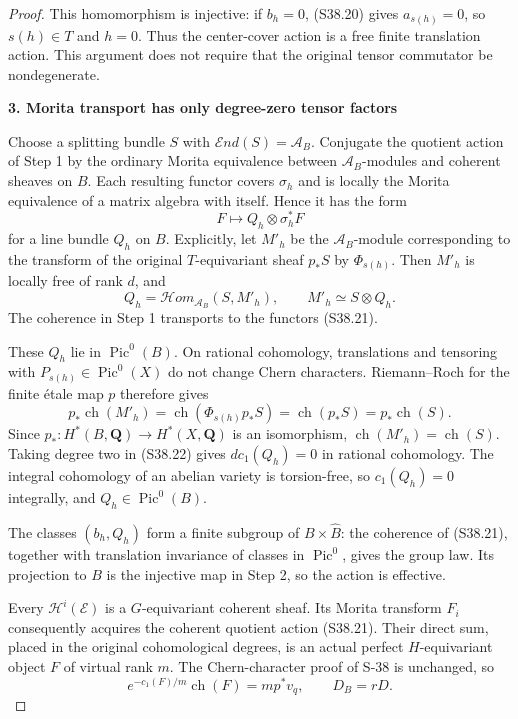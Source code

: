 \begin{proof}
This homomorphism is injective: if \(b_h=0\), (S38.20) gives \(a_{s(h)}=0\), so \(s(h)\in T\) and \(h=0\). Thus the center-cover action is a free finite translation action. This argument does not require that the original tensor commutator be nondegenerate.

\par

\medskip\noindent\textbf{3. Morita transport has only degree-zero tensor factors}\quad

Choose a splitting bundle \(S\) with \(\mathcal End(S)=\mathscr A_B\). Conjugate the quotient action of Step 1 by the ordinary Morita equivalence between \(\mathscr A_B\)-modules and coherent sheaves on \(B\). Each resulting functor covers \(\sigma_h\) and is locally the Morita equivalence of a matrix algebra with itself. Hence it has the form \[
 F\longmapsto Q_h\otimes\sigma_h^*F
 \tag{S38.21}
\] for a line bundle \(Q_h\) on \(B\). Explicitly, let \(M'_h\) be the \(\mathscr A_B\)-module corresponding to the transform of the original \(T\)-equivariant sheaf \(p_*S\) by \(\Phi_{s(h)}\). Then \(M'_h\) is locally free of rank \(d\), and \[
 Q_h=\mathcal Hom_{\mathscr A_B}(S,M'_h),\qquad
 M'_h\simeq S\otimes Q_h.
 \tag{S38.22}
\] The coherence in Step 1 transports to the functors (S38.21).

These \(Q_h\) lie in \(\operatorname{Pic}^0(B)\). On rational cohomology, translations and tensoring with \(P_{s(h)}\in\operatorname{Pic}^0(X)\) do not change Chern characters. Riemann--Roch for the finite étale map \(p\) therefore gives \[
 p_*\operatorname{ch}(M'_h)
 =\operatorname{ch}(\Phi_{s(h)}p_*S)
 =\operatorname{ch}(p_*S)
 =p_*\operatorname{ch}(S).
\] Since \(p_*:H^*(B,\mathbf Q)\to H^*(X,\mathbf Q)\) is an isomorphism, \(\operatorname{ch}(M'_h)=\operatorname{ch}(S)\). Taking degree two in (S38.22) gives \(d c_1(Q_h)=0\) in rational cohomology. The integral cohomology of an abelian variety is torsion-free, so \(c_1(Q_h)=0\) integrally, and \(Q_h\in\operatorname{Pic}^0(B)\).

The classes \((b_h,Q_h)\) form a finite subgroup of \(B\times\widehat B\): the coherence of (S38.21), together with translation invariance of classes in \(\operatorname{Pic}^0\), gives the group law. Its projection to \(B\) is the injective map in Step 2, so the action is effective.

Every \(\mathcal H^i(\mathcal E)\) is a \(G\)-equivariant coherent sheaf. Its Morita transform \(F_i\) consequently acquires the coherent quotient action (S38.21). Their direct sum, placed in the original cohomological degrees, is an actual perfect \(H\)-equivariant object \(F\) of virtual rank \(m\). The Chern-character proof of S-38 is unchanged, so \[
 e^{-c_1(F)/m}\operatorname{ch}(F)=m p^*v_q,
 \qquad D_B=rD.
 \tag{S38.23}
\]


\end{proof}
